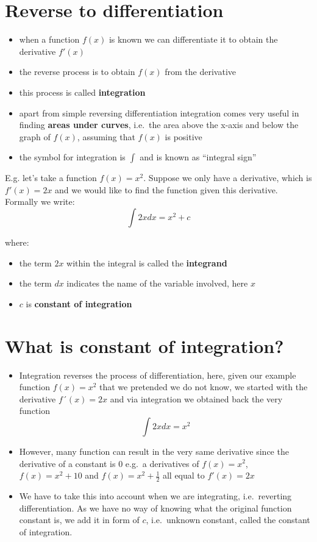 \documentclass[
]{book}
\providecommand{\tightlist}{%
  \setlength{\itemsep}{0pt}\setlength{\parskip}{0pt}}
\theoremstyle{definition}
\theoremstyle{definition}
\theoremstyle{definition}
\theoremstyle{remark}
\begin{document}
\hypertarget{reverse-to-differentiation}{%
\section{Reverse to differentiation}\label{reverse-to-differentiation}}

\begin{itemize}
\tightlist
\item
  when a function \(f(x)\) is known we can differentiate it to obtain the derivative \(f'(x)\)
\item
  the reverse process is to obtain \(f(x)\) from the derivative
\item
  this process is called \textbf{integration}
\item
  apart from simple reversing differentiation integration comes very useful in finding \textbf{areas under curves}, i.e.~the area above the x-axis and below the graph of \(f(x)\), assuming that \(f(x)\) is positive
\item
  the symbol for integration is \(\int\) and is known as ``integral sign''
\end{itemize}

E.g. let's take a function \(f(x) = x^2\). Suppose we only have a derivative, which is \(f'(x) = 2x\) and we would like to find the function given this derivative. Formally we write: \[\int 2x dx = x^2 +c\]

where:

\begin{itemize}
\tightlist
\item
  the term \(2x\) within the integral is called the \textbf{integrand}
\item
  the term \(dx\) indicates the name of the variable involved, here \(x\)
\item
  \(c\) is \textbf{constant of integration}
\end{itemize}

\hypertarget{what-is-constant-of-integration}{%
\section{What is constant of integration?}\label{what-is-constant-of-integration}}

\begin{itemize}
\tightlist
\item
  Integration reverses the process of differentiation, here, given our example function \(f(x) = x^2\) that we pretended we do not know, we started with the derivative \(f´(x) = 2x\) and via integration we obtained back the very function \[\int 2x dx = x^2\]
\item
  However, many function can result in the very same derivative since the derivative of a constant is 0 e.g.~a derivatives of \(f(x) = x^2\), \(f(x) = x^2 + 10\) and \(f(x) = x^2 + \frac{1}{2}\) all equal to \(f'(x) = 2x\)
\item
  We have to take this into account when we are integrating, i.e.~reverting differentiation. As we have no way of knowing what the original function constant is, we add it in form of \(c\), i.e.~unknown constant, called the constant of integration.
\end{itemize}
\end{document}
